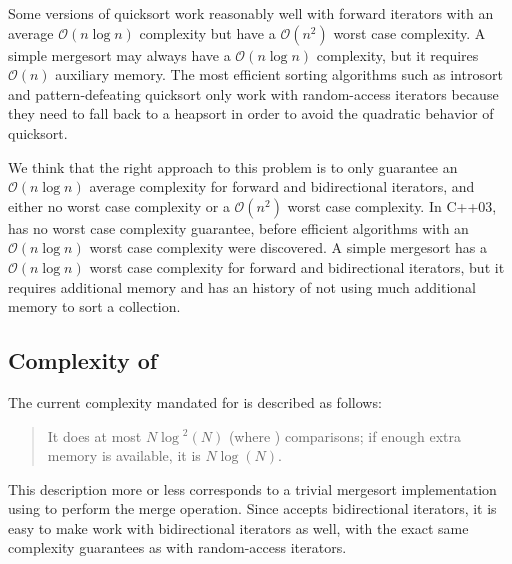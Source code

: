 \documentclass{isocpp_proposal}
\begin{document}
Some versions of quicksort work reasonably well with forward iterators with an average $\mathcal{O}(n \log{} n)$ complexity but have a $\mathcal{O}(n^2)$ worst case complexity. A simple mergesort may always have a $\mathcal{O}(n \log{} n)$ complexity, but it requires $\mathcal{O}(n)$ auxiliary memory. The most efficient sorting algorithms such as introsort \cite{introsort} and pattern-defeating quicksort \cite{pdqsort} only work with random-access iterators because they need to fall back to a heapsort in order to avoid the quadratic behavior of quicksort.

\vspace{0.3cm}

We think that the right approach to this  problem is to only guarantee an $\mathcal{O}(n \log{} n)$ average complexity for forward and bidirectional iterators, and either no worst case complexity or a $\mathcal{O}(n^2)$ worst case complexity. In C++03,  has no worst case complexity guarantee, before efficient algorithms with an $\mathcal{O}(n \log{} n)$ worst case complexity were discovered. A simple mergesort has a $\mathcal{O}(n \log{} n)$ worst case complexity for forward and bidirectional iterators, but it requires additional memory and  has an history of not using much additional memory to sort a collection.

\subsection{Complexity of }

The current complexity mandated for  is described as follows: 

\begin{quotation}
It does at most $N \log{}^2 (N)$ (where ) comparisons; if enough extra memory is available, it is  $N \log{} (N)$.
\end{quotation}

This description more or less corresponds to a trivial mergesort implementation using  to perform the merge operation. Since  accepts bidirectional iterators, it is easy to make \linebreak {} work with bidirectional iterators as well, with the exact same complexity guarantees as with random-access iterators.

\vspace{0.3cm}
\end{document}
